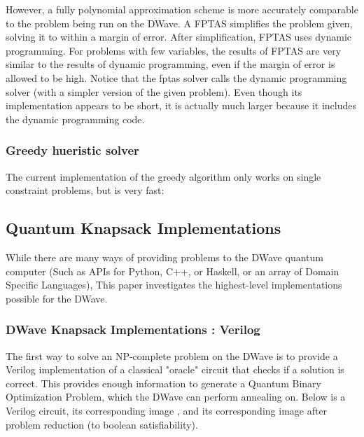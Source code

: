 \documentclass{article}
\begin{document}
However, a fully polynomial approximation scheme is more accurately comparable to the problem being run on the DWave.
A FPTAS simplifies the problem given, solving it to within a margin of error.
After simplification, FPTAS uses dynamic programming.
For problems with few variables, the results of FPTAS are very similar to the results of dynamic programming, even if the margin of error is allowed to be high.
Notice that the fptas solver calls the dynamic programming solver (with a simpler version of the given problem). Even though its implementation appears to be short, it is actually much larger because it includes the dynamic programming code.

\lstset{language=Python}


\subsubsection{Greedy hueristic solver}

The current implementation of the greedy algorithm only works on single constraint problems, but is very fast:

\lstset{language=Python}


\subsection{Quantum Knapsack Implementations}

While there are many ways of providing problems to the DWave quantum computer (Such as APIs for Python, C++, or Haskell, or an array of Domain Specific Languages), This paper investigates the highest-level implementations possible for the DWave.

\subsubsection{DWave Knapsack Implementations : Verilog}

The first way to solve an NP-complete problem on the DWave is to provide a Verilog implementation of a classical "oracle" circuit that checks if a solution is correct.
This provides enough information to generate a Quantum Binary Optimization Problem, which the DWave can perform annealing on.
Below is a Verilog circuit, its corresponding image , and its corresponding image after problem reduction (to boolean satisfiability).
\end{document}
